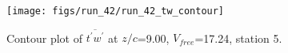 \begin{figure}[H]
\centering
\texttt{[image: figs/run\_42/run\_42\_tw\_contour]}
\caption{Contour plot of $\overline{t^\prime w^\prime}$ at $z/c$=9.00, $V_{free}$=17.24, station 5.}
\label{fig:run_42_tw_contour}
\end{figure}


